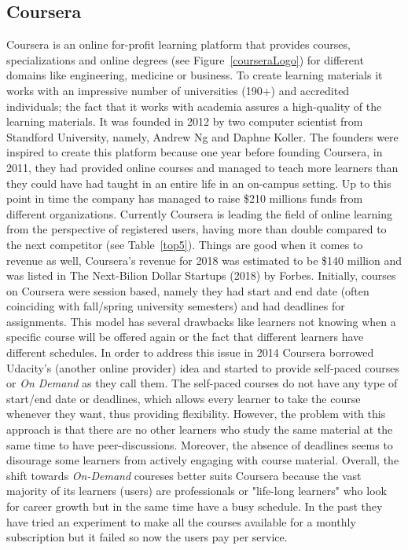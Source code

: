 \documentclass[11]{article}
\begin{document}
	\subsection{Coursera}
	Coursera is an online for-profit learning platform that provides courses, specializations and online degrees (see Figure~\ref{courseraLogo}) for different domains like engineering, medicine or business. To create learning materials it works with an impressive number of universities (190+) and accredited individuals; the fact that it works with academia assures a high-quality of the learning materials. It was founded in 2012 by two computer scientist from Standford University, namely, Andrew Ng and Daphne Koller. The founders were inspired to create this platform because one year before founding Coursera, in 2011, they had provided online courses and managed to teach more learners than they could have had taught in an entire life in an on-campus setting. Up to this point in time the company has managed to raise \$210 millions funds from different organizations. Currently Coursera is leading the field of online learning from the perspective of registered users, having more than double compared to the next competitor (see Table~\ref{top5}). Things are good when it comes to revenue as well, Coursera's revenue for 2018 was estimated to be \$140 million and was listed in The Next-Bilion Dollar Startups (2018) by Forbes. Initially, courses on Coursera were session based, namely they had start and end date (often coinciding with fall/spring university semesters) and had deadlines for assignments. This model has several drawbacks like learners not knowing when a specific course will be offered again or the fact that different learners have different schedules. In order to address this issue in 2014 Coursera borrowed Udacity's (another online provider) idea and started to provide self-paced courses or \textit{On Demand} as they call them. The self-paced courses do not have any type of start/end date or deadlines, which allows every learner to take the course whenever they want, thus providing flexibility.  However, the problem with this approach is that there are no other learners who study the same material at the same time to have peer-discussions. Moreover, the absence of deadlines seems to disourage some learners from actively engaging with course material. Overall, the shift towards \textit{On-Demand} coureses better suits Coursera because  the vast majority of its learners (users)  are professionals or "life-long learners" who look for career growth but in the same time have a busy schedule. In the past they have tried an experiment to make all the courses available for a monthly subscription but it failed so now the users pay per service.\\ 
\end{document}
